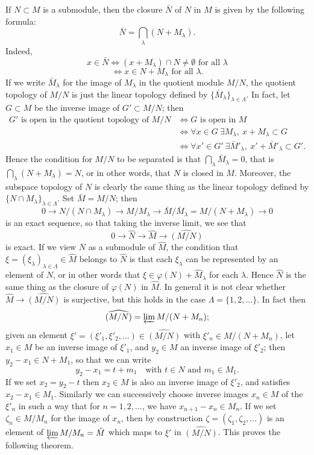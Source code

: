If $N \subset M$ is a submodule, then the closure $\bar{N}$ of $N$ in $M$ is given by the
following formula:
\[
  \bar{N} = \bigcap_\lambda (N + M_\lambda).
\]
Indeed,
\[
  x \in \bar{N} \iff (x + M_\lambda) \cap N \neq \emptyset \text{ for all } \lambda
\]
\[
  \iff x \in N + M_\lambda \text{ for all } \lambda.
\]
If we write $\bar{M}_\lambda$ for the image of $M_\lambda$ in the quotient module $M/N$, the
quotient topology of $M/N$ is just the linear topology defined by $\{\bar{M}_\lambda\}_{\lambda \in \Lambda}$.
In fact, let $G \subset M$ be the inverse image of $G' \subset M/N$; then
\begin{align*}
  G' \text{ is open in the quotient topology of } M/N
  &\iff G \text{ is open in } M \\
  &\iff \forall x \in G \ \exists M_\lambda,\ x + M_\lambda \subset G \\
  &\iff \forall x' \in G' \ \exists \bar{M}'_\lambda,\ x' + \bar{M}'_\lambda \subset G'.
\end{align*}
Hence the condition for $M/N$ to be separated is that $\bigcap_\lambda \bar{M}_\lambda = 0$, that is
$\bigcap_\lambda (N + M_\lambda) = N$, or in other words, that $N$ is closed in $M$. Moreover, the
subspace topology of $N$ is clearly the same thing as the linear topology
defined by $\{N \cap M_\lambda\}_{\lambda \in \Lambda}$. Set $\bar{M} = M/N$; then
\[
  0 \to N/(N \cap M_\lambda) \to M/M_\lambda \to \bar{M}/\bar{M}_\lambda = M/(N + M_\lambda) \to 0
\]
is an exact sequence, so that taking the inverse limit, we see that
\[
  0 \to \hat{N} \to \hat{M} \to \widehat{(M/N)}
\]
is exact. If we view $N$ as a submodule of $\hat{M}$, the condition that $\xi = (\xi_\lambda)_{\lambda \in \Lambda} \in \hat{M}$
belongs to $\hat{N}$ is that each $\xi_\lambda$ can be represented by an element of $N$, or in
other words that $\xi \in \varphi(N) + \hat{M}_\lambda$ for each $\lambda$. Hence $\hat{N}$ is the same thing as the
closure of $\varphi(N)$ in $\hat{M}$. In general it is not clear whether $\hat{M} \to \widehat{(M/N)}$ is
surjective, but this holds in the case $\Lambda = \{1, 2, \ldots\}$. In fact then
\[
  \widehat{(M/N)} = \varprojlim M/(N + M_n);
\]
given an element $\xi' = (\xi'_1, \xi'_2, \ldots) \in \widehat{(M/N)}$ with $\xi'_n \in M/(N + M_n)$, let
$x_1 \in M$ be an inverse image of $\xi'_1$, and $y_2 \in M$ an inverse image of $\xi'_2$;
then $y_2 - x_1 \in N + M_1$, so that we can write
\[
  y_2 - x_1 = t + m_1 \quad \text{with } t \in N \text{ and } m_1 \in M_1.
\]
If we set $x_2 = y_2 - t$ then $x_2 \in M$ is also an inverse image of $\xi'_2$, and satisfies
$x_2 - x_1 \in M_1$. Similarly we can successively choose inverse images $x_n \in M$ of
the $\xi'_n$ in such a way that for $n = 1, 2, \ldots$, we have $x_{n+1} - x_n \in M_n$. If we set
$\zeta_n \in M/M_n$ for the image of $x_n$, then by construction $\zeta = (\zeta_1, \zeta_2, \ldots)$ is an
element of $\varprojlim M/M_n = \hat{M}$ which maps to $\xi'$ in $\widehat{(M/N)}$. This proves the
following theorem.

